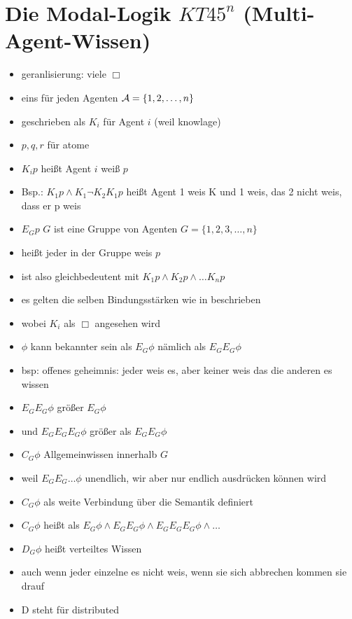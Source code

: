
\section{Die Modal-Logik $KT45^n$ (Multi-Agent-Wissen)} %
\label{sub:the_modal_logic_kt45_n_}


\begin{itemize}
	\item geranlisierung: viele $\Box$
	\item eins für jeden Agenten $\mathcal{A} = \{1,2,\dots,n\}$ 
	\item geschrieben als $K_i$ für Agent $i$ (weil knowlage)
	\item $p,q,r$ für atome
	\item $K_ip$ heißt Agent $i$ weiß $p$
	\item Bsp.: $K_1p \wedge K_1 \neg K_2 K_1 p$ heißt Agent 1 weis K und 1 weis, das 2 nicht weis, dass er p weis
	\item $E_G p$ $G$ ist eine Gruppe von Agenten $G= \{1,2,3,\dots,n\}$
	\item heißt jeder in der Gruppe weis $p$
	\item ist also gleichbedeutent mit $K_1 p \wedge K_2 p \wedge \dots K_n p$
	\item es gelten die selben Bindungsstärken wie in  beschrieben
	\item wobei $K_i$ als $\Box$ angesehen wird
\end{itemize}

\begin{itemize}
	\item $\phi$ kann bekannter sein als $E_G \phi$ nämlich als $E_G E_G \phi$
	\item bsp: offenes geheimnis: jeder weis es, aber keiner weis das die anderen es wissen
	\item $E_G E_G \phi$ größer $E_G \phi$
	\item und $E_G E_G E_G \phi$ größer als $E_G E_G \phi$
	\item $C_G \phi$ Allgemeinwissen innerhalb $G$ 
	\item weil $E_G E_G \dots \phi$ unendlich, wir aber nur endlich ausdrücken können wird 
	\item $C_G \phi$ als weite Verbindung über die Semantik definiert
	\item $C_G \phi$ heißt als $E_G \phi \wedge E_G E_G \phi \wedge E_G E_G E_G \phi \wedge \dots$
	\item $D_G \phi$ heißt verteiltes Wissen
	\item auch wenn jeder einzelne es nicht weis, wenn sie sich abbrechen kommen sie drauf
	\item D steht für distributed
\end{itemize}



